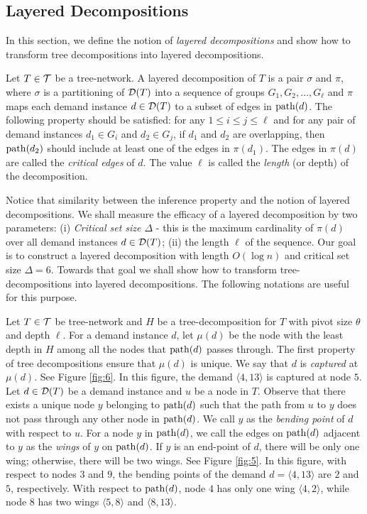 \documentclass[11pt]{article}
\newcommand{\calT} {{\cal T}}
\newcommand{\calD} {{\cal D}}
\newcommand{\mypath} {{\rm path}}
\newcommand{\pair}[2] {\langle #1,#2 \rangle}
\begin{document}
\subsection{Layered Decompositions}
In this section, we define the notion of {\em layered decompositions} and 
show how to transform tree decompositions into layered decompositions.

Let $T\in \calT$ be a tree-network. A layered decomposition of $T$ is a pair 
$\sigma$ and $\pi$, where $\sigma$ is a partitioning of $\calD(T)$ into a
sequence of groups $G_1, G_2, \ldots, G_{\ell}$ and $\pi$ maps each demand instance $d\in \calD(T)$
to a subset of edges in $\mypath(d)$. The following property should be satisfied:
for any $1\leq i\leq j\leq \ell$ and for any pair of demand instances $d_1\in G_i$ and $d_2\in G_j$,
if $d_1$ and $d_2$ are overlapping, then $\mypath(d_2)$ should include at least one of the 
edges in $\pi(d_1)$. The edges in $\pi(d)$ are called the {\em critical edges} of $d$.
The value $\ell$ is called the {\em length} (or depth) of the decomposition.

Notice that similarity between the inference property and the notion of layered decompositions.
We shall measure the efficacy of a layered decomposition by two parameters:
(i) {\it Critical set size $\Delta$} -  this is the maximum cardinality of $\pi(d)$ over all 
demand instances $d\in \calD(T)$; (ii) the length $\ell$ of the sequence.
Our goal is to construct a layered decomposition with length $O(\log n)$
and critical set size $\Delta=6$. Towards that goal we shall show how to transform 
tree-decompositions into layered decompositions. The following notations are useful for this purpose.

Let $T\in \calT$ be tree-network and $H$ be a tree-decomposition for $T$
with pivot size $\theta$ and depth $\ell$. 
For a demand instance $d$, let $\mu(d)$
be the node with the least depth in $H$ among all the nodes that $\mypath(d)$ passes through.
The first property of tree decompositions ensure that $\mu(d)$ is unique.
We say that $d$ is {\em captured} at $\mu(d)$. See Figure \ref{fig:6}.
In this figure, the demand $\pair{4}{13}$ is captured at node $5$.
Let $d\in \calD(T)$ be a demand instance and $u$ be a node in $T$.
Observe that there exists a unique node $y$ belonging to $\mypath(d)$
such that the path from $u$ to $y$ does not pass through any other node in $\mypath(d)$.
We call $y$ as the {\em bending point} of $d$ with respect to $u$.
For a node $y$ in $\mypath(d)$, we call the edges on $\mypath(d)$ adjacent to $y$ as the {\em wings} of $y$ on $\mypath(d)$.
If $y$ is an end-point of $d$, there will be only one wing; otherwise, there will be two wings.
See Figure \ref{fig:5}.
In this figure, with respect to nodes $3$ and $9$, 
the bending points of the demand $d=\pair{4}{13}$ are $2$ and $5$, respectively.
With respect to $\mypath(d)$, node $4$ has only one wing $\pair{4}{2}$, while node
$8$ has two wings $\pair{5}{8}$ and $\pair{8}{13}$.
\end{document}
